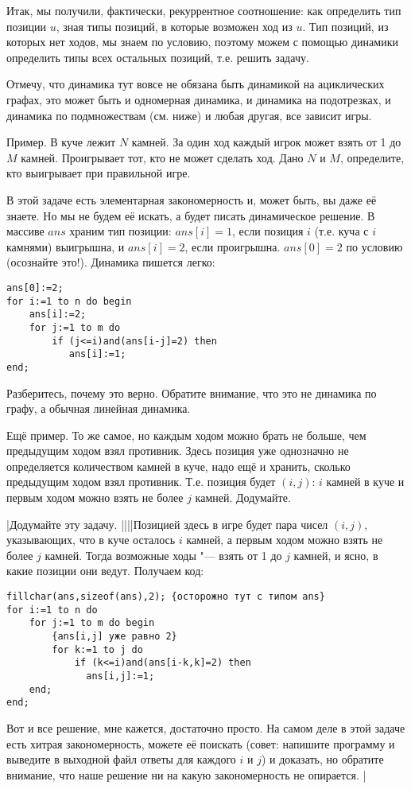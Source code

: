 Итак, мы получили, фактически, рекуррентное соотношение: как определить тип
позиции $u$, зная типы позиций, в которые возможен ход из $u$.
Тип позиций, из которых нет ходов, мы знаем по условию, поэтому можем с помощью динамики определить типы всех остальных позиций,
т.е. решить задачу. 

Отмечу, что динамика тут вовсе не обязана быть динамикой на ациклических графах, это может быть и одномерная динамика,
и динамика на подотрезках, и динамика по подмножествам (см. ниже) и любая другая, все зависит игры.

Пример. В куче лежит $N$ камней. За один ход каждый игрок может взять от 1 до $M$ камней. Проигрывает тот, кто не может сделать ход.
Дано $N$ и $M$, определите, кто выигрывает при правильной игре.

В этой задаче есть элементарная закономерность и, может быть, вы даже её знаете. Но мы не будем её искать, а будет писать 
динамическое решение. В массиве $ans$ храним тип позиции: $ans[i]=1$, если позиция $i$ (т.е. куча с $i$ камнями)
выигрышна, и $ans[i]=2$, если проигрышна. $ans[0]=2$ по условию (осознайте это!). Динамика пишется легко:
\begin{codesampleo}\begin{verbatim}
ans[0]:=2;
for i:=1 to n do begin
    ans[i]:=2;
    for j:=1 to m do
        if (j<=i)and(ans[i-j]=2) then
           ans[i]:=1;
end;
\end{verbatim}
\end{codesampleo}
Разберитесь, почему это верно. Обратите внимание, что это не динамика по графу, а обычная линейная динамика.

Ещё пример. То же самое, но каждым ходом можно брать не больше, чем предыдущим ходом взял противник. Здесь позиция уже 
однозначно не определяется количеством камней в куче, надо ещё и хранить, сколько предыдущим ходом взял противник.
Т.е. позиция будет $(i,j)$: $i$ камней в куче и первым ходом можно взять не более $j$ камней. Додумайте.

\task|Додумайте эту задачу.
||||Позицией здесь в игре будет пара чисел $(i,j)$, указывающих, что в куче осталось $i$ камней, а первым ходом можно взять не более $j$ камней. Тогда возможные ходы "--- взять от 1 до $j$ камней, и ясно, в какие позиции они ведут. Получаем код:
\begin{codesampleo}\begin{verbatim}
fillchar(ans,sizeof(ans),2); {осторожно тут с типом ans}
for i:=1 to n do 
    for j:=1 to m do begin
        {ans[i,j] уже равно 2}
        for k:=1 to j do
            if (k<=i)and(ans[i-k,k]=2) then
              ans[i,j]:=1;
    end;
end;
\end{verbatim}
\end{codesampleo}
Вот и все решение, мне кажется, достаточно просто. На самом деле в этой задаче есть хитрая закономерность, можете её поискать (совет: напишите программу и выведите в выходной файл ответы для каждого $i$ и $j$) и доказать, но обратите внимание, что наше решение ни на какую закономерность не опирается.
|

